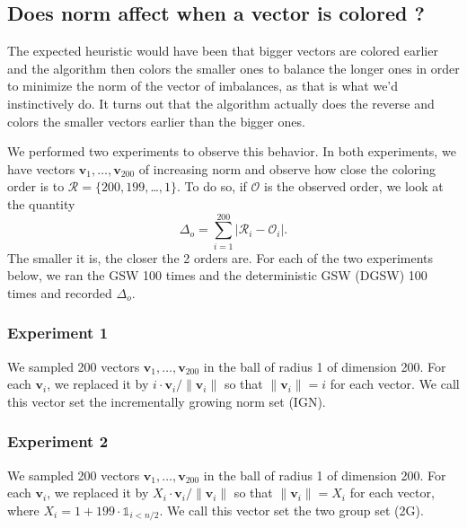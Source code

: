 \documentclass[12pt]{article}
\begin{document}
\subsection{Does norm affect when a vector is colored ?}\label{norm_affect_when}
The expected heuristic would have been that bigger vectors are colored earlier and the algorithm then colors the smaller ones to balance the longer ones in order to minimize the norm of the vector of imbalances, as that is what we'd instinctively do. It turns out that the algorithm actually does the reverse and colors the smaller vectors earlier than the bigger ones.

We performed two experiments to observe this behavior. In both experiments, we have vectors $\textbf{v}_1,\dots,\textbf{v}_{200}$ of increasing norm and observe how close the coloring order is to $\mathcal{R}=\{200,199,$\dots$,1\}$. To do so, if $\mathcal{O}$ is the observed order, we look at the quantity 
\begin{equation}
\Delta_{o}=\sum_{i=1}^{200}|\mathcal{R}_i-\mathcal{O}_i|.
\label{orderdistance}
\end{equation}
The smaller it is, the closer the 2 orders are. For each of the two experiments below, we ran the GSW 100 times and the deterministic GSW (DGSW) 100 times and recorded $\Delta_o$.

\subsubsection{Experiment 1}
We sampled 200 vectors $\textbf{v}_1,\dots,\textbf{v}_{200}$ in the ball of radius 1 of dimension 200. For each $\textbf{v}_i$, we replaced it by $i\cdot \textbf{v}_i/\|\textbf{v}_i\|$ so that $\|\textbf{v}_i\|=i$ for each vector. We call this vector set the incrementally growing norm set (IGN).


\subsubsection{Experiment 2}
We sampled 200 vectors $\textbf{v}_1,\dots,\textbf{v}_{200}$ in the ball of radius 1 of dimension 200. For each $\textbf{v}_i$, we replaced it by $X_i\cdot \textbf{v}_i/\|\textbf{v}_i\|$ so that $\|\textbf{v}_i\|=X_i$ for each vector, where $X_i=1 + 199\cdot\mathds{1}_{i<n/2}$. We call this vector set the two group set (2G).
\end{document}
